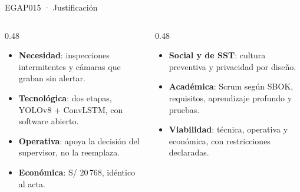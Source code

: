 \documentclass[aspectratio=169,11pt]{beamer}
\begin{document}
\begin{frame}{EGAP015 · Justificación}
\begin{columns}[T]
\begin{column}{0.48\textwidth}\small
\begin{itemize}\setlength{\itemsep}{6pt}
  \item \textbf{Necesidad}: inspecciones intermitentes y cámaras que graban sin alertar.
  \item \textbf{Tecnológica}: dos etapas, YOLOv8 + ConvLSTM, con software abierto.
  \item \textbf{Operativa}: apoya la decisión del supervisor, no la reemplaza.
  \item \textbf{Económica}: S/ 20\,768, idéntico al acta.
\end{itemize}
\end{column}
\begin{column}{0.48\textwidth}\small
\begin{itemize}\setlength{\itemsep}{6pt}
  \item \textbf{Social y de SST}: cultura preventiva y privacidad por diseño.
  \item \textbf{Académica}: Scrum según SBOK, requisitos, aprendizaje profundo y pruebas.
  \item \textbf{Viabilidad}: técnica, operativa y económica, con restricciones declaradas.
\end{itemize}
\vspace{6pt}
\end{column}
\end{columns}
\end{frame}
\end{document}
